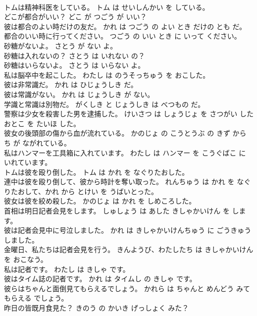 \documentclass[8pt]{extreport}
\begin{document}
\begin{CJK}{UTF8}{min}
\\	トムは精神科医をしている。	トム は せいしんかい を している。	
\\	どこが都合がいい？	どこ が つごう が いい？	
\\	彼は都合のよい時だけの友だ。	かれ は つごう の よい とき だけの とも だ。	
\\	都合のいい時に行ってください。	つごう の いい とき に いって ください。	
\\	砂糖がないよ。	さとう が ない よ。	
\\	砂糖は入れないの？	さとう は いれない の？	
\\	砂糖はいらないよ。	さとう は いらない よ。	
\\	私は脳卒中を起こした。	わたし は のうそっちゅう を おこした。	
\\	彼は非常識だ。	かれ は ひじょうしき だ。	
\\	彼は常識がない。	かれ は じょうしき が ない。	
\\	学識と常識は別物だ。	がくしき と じょうしき は べつもの だ。	
\\	警察は少女を殺害した男を逮捕した。	けいさつ は しょうじょ を さつがい した おとこ を たいほ した。	
\\	彼女の後頭部の傷から血が流れている。	かのじょ の こうとうぶ の きず から ち が ながれている。	
\\	私はハンマーを工具箱に入れています。	わたし は ハンマー を こうぐばこ に いれています。	
\\	トムは彼を殴り倒した。	トム は かれ を なぐりたおした。	
\\	連中は彼を殴り倒して、彼から時計を奪い取った。	れんちゅう は かれ を なぐりたおして、かれ から とけい を うばいとった。	
\\	彼女は彼を絞め殺した。	かのじょ は かれ を しめころした。	
\\	首相は明日記者会見をします。	しゅしょう は あした きしゃかいけん を します。	
\\	彼は記者会見中に号泣しました。	かれ は きしゃかいけんちゅう に ごうきゅう しました。	
\\	金曜日、私たちは記者会見を行う。	きんようび、わたしたち は きしゃかいけん を おこなう。	
\\	私は記者です。	わたし は きしゃ です。	
\\	彼はタイム誌の記者です。	かれ は タイムし の きしゃ です。	
\\	彼らはちゃんと面倒見てもらえるでしょう。	かれら は ちゃんと めんどう みて もらえる でしょう。	
\\	昨日の皆既月食見た？	きのう の かいき げっしょく みた？	

\end{CJK}
\end{document}
